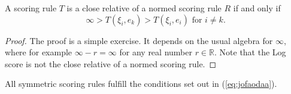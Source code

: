 \documentclass[12pt]{article}
\begin{document}
\begin{lemma}
  \label{lma:heechoam}
    A scoring rule $T$ is a close relative of a normed scoring rule
    $R$ if and only if
\begin{equation}
  \label{eq:jofaodaa}
    \infty>T(\xi_{i},e_{k})>T(\xi_{i},e_{i})\mbox{ for }i\neq{}k.
\end{equation}
\end{lemma}
\begin{proof}
  \label{prf:eghiexee}
  The proof is a simple exercise. It depends on the usual algebra for
  $\infty$, where for example $\infty-r=\infty$ for any real number
  $r\in\mathbb{R}$. Note that the Log score is not the close relative
  of a normed scoring rule.
\end{proof}

\begin{lemma}
\label{lma:noopiebi}
  All symmetric scoring rules fulfill the conditions set out in
  (\ref{eq:jofaodaa}).
\end{lemma}
\end{document}
